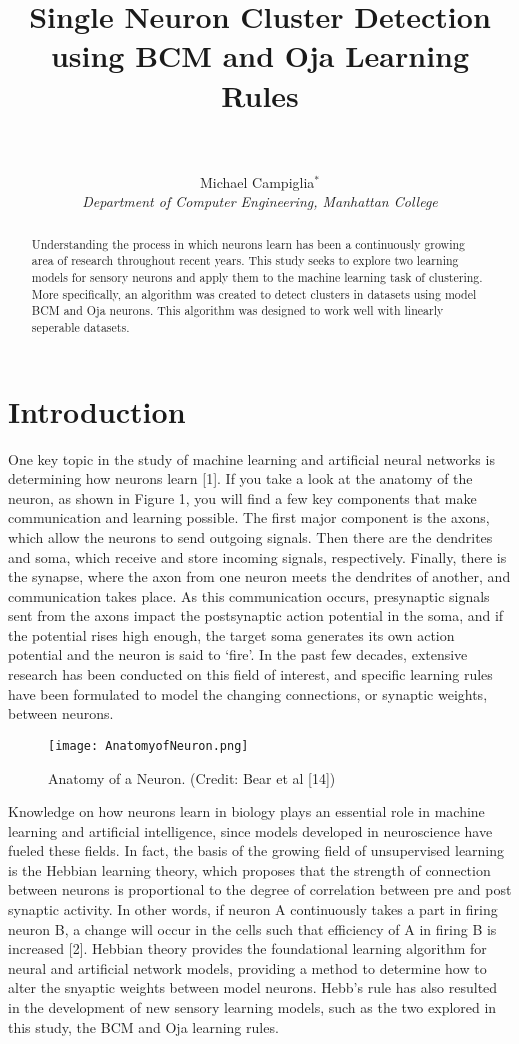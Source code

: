 \documentclass[10pt,twoside]{article}
\title{{Single Neuron Cluster Detection using BCM and Oja Learning Rules}\\
\blfootnote{\normalsize$^{*}$Research mentored by {Lawrence Udeigwe}, Ph.D.}
\\
}}
\author{{Michael Campiglia}$^{*}$\\
\it{ Department of {Computer Engineering}, Manhattan College}
\\}
\begin{document}
 

\maketitle

\begin{abstract}
Understanding the process in which neurons learn has been a 
continuously growing area of research throughout recent years. This study
seeks to explore two learning models for sensory neurons and apply them to 
the machine learning task of clustering. More specifically, an algorithm was created 
to detect clusters in datasets using model BCM and Oja neurons. This algorithm was designed to work well with linearly seperable datasets.
\end{abstract}

\section*{\centering Introduction}
One key topic in the study of machine learning and artificial neural 
networks is determining how neurons learn [1]. If you take a look at the anatomy of the neuron, as shown in Figure 1, you
will find a few key components that make communication and learning possible. The first major component is the axons, 
which allow the neurons to send outgoing signals. Then there are the dendrites and soma, which receive and store
incoming signals, respectively. Finally, there is the synapse, where the axon from one neuron meets 
the dendrites of another, and communication takes place. As this communication occurs, presynaptic signals sent from the axons 
impact the postsynaptic action potential in the soma, and if the potential rises high enough, the target soma generates its own 
action potential and the neuron is said to `fire'.  In the past few decades, extensive research has been conducted on this field of 
interest, and specific learning rules have been formulated to model the changing connections, or synaptic weights, between neurons. 

\begin{figure}[H]\small\centering\label{fig1}
\texttt{[image: AnatomyofNeuron.png]}
\caption{Anatomy of a Neuron. (Credit: Bear et al [14])}
\end{figure}

Knowledge on how neurons learn in biology plays an essential role in machine learning and artificial intelligence, since 
models developed in neuroscience have fueled these fields. In fact, the basis of the growing field of unsupervised learning
is the Hebbian learning theory, which proposes that the strength of connection between
neurons is proportional to the degree of correlation between pre and post synaptic activity. In other words, 
if neuron A continuously takes a part in firing neuron B, a change will occur in the cells such
that efficiency of A in firing B is increased [2]. Hebbian theory provides the foundational  
learning algorithm for neural and artificial network models, providing a method to determine how to alter the snyaptic 
weights between model neurons. Hebb's rule has also resulted in the development of new sensory
learning models, such as the two explored in this study, the BCM and Oja learning rules. 
\end{document}
